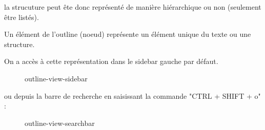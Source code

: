 \documentclass[
    iict, %
    il, %
]{heig-tb}
\begin{document}
la strucuture peut ête donc représenté de manière hiérarchique ou non (seulement être listés).




Un élément de l'outline (noeud) représente un élément unique du texte ou une structure.

On a accès à cette représentation dans le sidebar gauche par défaut.

\begin{figure}[!h]
    \begin{center}
    \end{center}
    \caption[outline-view-sidebar]{\label{outline-view-sidebar} outline-view-sidebar}
\end{figure}

ou depuis la barre de recherche en saisissant la commande "CTRL + SHIFT + o" :

\begin{figure}[!h]
    \begin{center}
    \end{center}
    \caption[outline-view-searchbar]{\label{outline-view-searchbar} outline-view-searchbar}
\end{figure}
\end{document}
